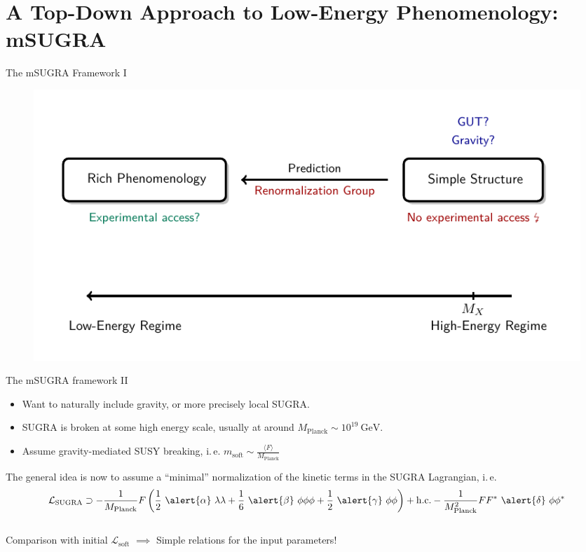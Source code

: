 \section{A Top-Down Approach to Low-Energy Phenomenology: mSUGRA}

\begin{frame}{The mSUGRA Framework I}
\addtocounter{framenumber}{-1}
\begin{figure}
	\centering
	\includegraphics[scale = 1]{figures/mSUGRA_idea}
\end{figure}
\end{frame}

\begin{frame}{The mSUGRA framework II}
\begin{itemize}
	\item Want to naturally include \alert{gravity}, or more precisely \alert {local SUGRA}.\\[1em]
	\item SUGRA is broken at some high energy scale, usually at around $M_{\mathrm{Planck}}\sim 10^{19}\ \mathrm{GeV}$.\\[1em]
	\item Assume \alert{gravity-mediated SUSY breaking}, i.\,e. $m_{\mathrm{soft}} \sim \frac{\langle F\rangle}{M_{\mathrm{Planck}}}$\\[1em]
\end{itemize}
The general idea is now to assume a \alert{\enquote{minimal} normalization} of the kinetic terms in the SUGRA Lagrangian, i.\,e.
\begin{equation*}
	\mathcal{L}_{\mathrm{SUGRA}} \supset-\frac{1}{M_{\mathrm{Planck}}} F\left(\frac{1}{2} \ \alert{\alpha}\ \lambda \lambda+\frac{1}{6} \ \alert{\beta}\  \phi \phi \phi+\frac{1}{2} \ \alert{\gamma}\ \phi \phi\right)+\mathrm{h.c.}-\frac{1}{M_{\mathrm{Planck}}^{2}} F F^{*} \ \alert{\delta}\ \phi \phi^*
\end{equation*}\\[0.5em]

Comparison with initial $\mathcal{L}_{\mathrm{soft}}$ $\implies$ Simple relations for the input parameters!
\end{frame}

